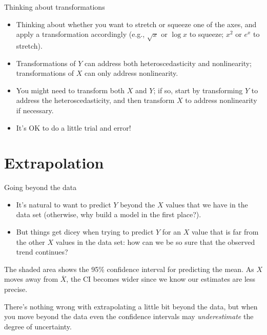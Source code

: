 \documentclass{beamer}\usepackage[]{graphicx}\usepackage[]{color}
\newenvironment{knitrout}{}{} %
\begin{document}
\begin{darkframes}
    \begin{frame}{Thinking about transformations}
      \begin{itemize}[<+->]
        \item Thinking about whether you want to stretch or squeeze one of the axes, and apply a transformation accordingly (e.g., $\sqrt x$ or $\log x$ to squeeze; $x^2$ or $e^x$ to stretch).
        \item Transformations of $Y$ can address both heteroscedasticity and nonlinearity; transformations of $X$ can only address nonlinearity.
        \item You might need to transform both $X$ and $Y$; if so, start by transforming $Y$ to address the heteroscedasticity, and then transform $X$ to address nonlinearity if necessary.
        \item It's OK to do a little trial and error!
      \end{itemize}
    \end{frame}

    \section{Extrapolation}

    \begin{frame}{Going beyond the data}
      \begin{itemize}
        \item It's natural to want to predict $Y$ beyond the $X$ values that we have in the data set (otherwise, why build a model in the first place?).
        \item But things get dicey when trying to predict $Y$ for an $X$ value that is far from the other $X$ values in the data set: how can we be so sure that the observed trend continues?
      \end{itemize}
    \end{frame}

    \begin{frame}[fragile]
      The shaded area shows the 95\% confidence interval for predicting the mean.
      As $X$ moves away from $\overline X$, the CI becomes wider since we know our estimates are less precise.
\begin{knitrout}


\end{knitrout}
    \end{frame}

    \begin{frame}
      \begin{center}
        There's nothing wrong with extrapolating a little bit beyond the data, but when you move beyond the data even the confidence intervals may \emph{underestimate} the degree of uncertainty.
      \end{center}
    \end{frame}
  \end{darkframes}
\end{document}
